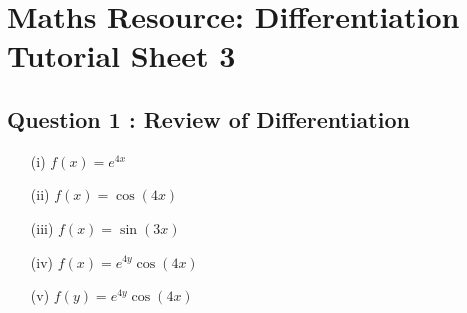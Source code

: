 \documentclass[]{article}
\begin{document}
\section*{Maths Resource: Differentiation Tutorial Sheet 3}
\subsection*{Question 1 : Review of Differentiation}
\begin{multicols}{2}
\begin{itemize}
\item[(i)] $f(x) = e^{4x}$
\item[(ii)] $f(x) = \cos(4x)$
\item[(iii)] $f(x) = \sin(3x)$
\item[(iv)] $f(x) = e^{4y} \cos(4x)$
\item[(v)] $f(y) = e^{4y} \cos(4x)$
\end{itemize}
\end{multicols}
\end{document}
